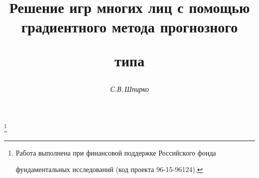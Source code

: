 

 


% 


 


\newcommand{\la}{\langle} 


\newcommand{\ra}{\rangle} 


\newcommand{\tts}[1]{} 




 




 


\setcounter{page}{63} 












 


\author{\it С.В.\,Шпирко} 




\title{Решение игр многих лиц с помощью градиентного метода прогнозного 


типа} 


\thanks{Работа выполнена при финансовой поддержке Российского фонда 


фундаментальных исследований (код проекта 96-15-96124).} 


 


\date{} 




\pagestyle{plain} %


